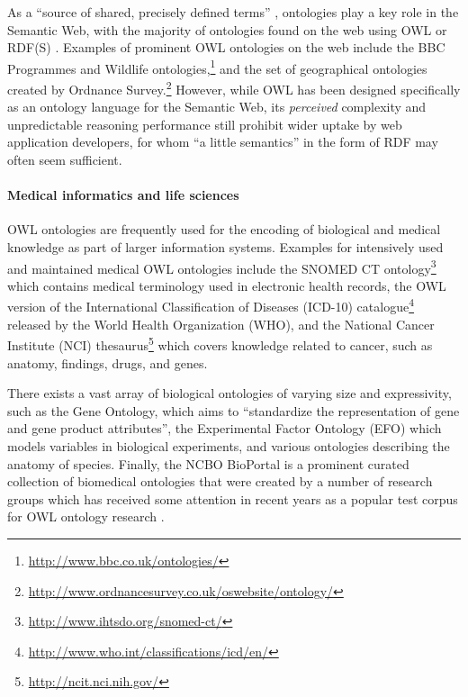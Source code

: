 As a \enquote{source of shared, precisely defined terms} \cite{horrocks02aa}, ontologies play a key role in the Semantic Web,  with the majority of ontologies found on the web using OWL or RDF(S) \cite{cardoso07xj}. Examples of prominent OWL ontologies on the web include the BBC Programmes and Wildlife ontologies,\footnote{\url{http://www.bbc.co.uk/ontologies/}} and the set of geographical ontologies created by Ordnance Survey.\footnote{\url{http://www.ordnancesurvey.co.uk/oswebsite/ontology/}} However, while OWL has been designed specifically as an ontology language for the Semantic Web, its \emph{perceived} complexity and unpredictable reasoning performance still prohibit wider uptake by web application developers, for whom \enquote{a little semantics} \cite{hendler07aa} in the form of RDF may often seem sufficient.

\paragraph{Medical informatics and life sciences}
OWL ontologies are frequently used for the encoding of biological and medical knowledge as part of larger information systems. Examples for intensively used and maintained medical OWL ontologies include the SNOMED CT ontology\footnote{\url{http://www.ihtsdo.org/snomed-ct/}} which contains medical terminology used in electronic health records, the OWL version of the International Classification of Diseases (ICD-10) catalogue\footnote{\url{http://www.who.int/classifications/icd/en/}} released by the World Health Organization (WHO), and the National Cancer Institute (NCI) thesaurus\footnote{\url{http://ncit.nci.nih.gov/}} which covers knowledge related to cancer, such as anatomy, findings, drugs, and genes. 

There exists a vast array of biological ontologies of varying size and expressivity, such as the Gene Ontology, which aims to \enquote{standardize the representation of gene and gene product attributes}, the Experimental Factor Ontology (EFO) which models variables in biological experiments, and various ontologies describing the anatomy of species. Finally, the NCBO BioPortal \cite{noy09jc} is a prominent curated collection of biomedical ontologies that were created by a number of research groups which has received some attention in recent years as a popular test corpus for OWL ontology research \cite{bail11jm,horridge11ac,horridge12aa,mikroyannidi12qf}.





